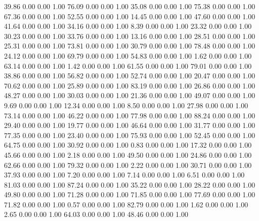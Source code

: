    39.86   0.00   0.00   1.00
   76.09   0.00   0.00   1.00
   35.08   0.00   0.00   1.00
   75.38   0.00   0.00   1.00
   67.36   0.00   0.00   1.00
   52.55   0.00   0.00   1.00
   14.45   0.00   0.00   1.00
   47.60   0.00   0.00   1.00
   41.64   0.00   0.00   1.00
   34.16   0.00   0.00   1.00
    8.39   0.00   0.00   1.00
   23.32   0.00   0.00   1.00
   30.23   0.00   0.00   1.00
   33.76   0.00   0.00   1.00
   13.16   0.00   0.00   1.00
   28.51   0.00   0.00   1.00
   25.31   0.00   0.00   1.00
   73.81   0.00   0.00   1.00
   30.79   0.00   0.00   1.00
   78.48   0.00   0.00   1.00
   24.12   0.00   0.00   1.00
   69.79   0.00   0.00   1.00
   54.83   0.00   0.00   1.00
    1.62   0.00   0.00   1.00
   63.14   0.00   0.00   1.00
    1.42   0.00   0.00   1.00
   61.55   0.00   0.00   1.00
   79.01   0.00   0.00   1.00
   38.86   0.00   0.00   1.00
   56.82   0.00   0.00   1.00
   52.74   0.00   0.00   1.00
   20.47   0.00   0.00   1.00
   70.62   0.00   0.00   1.00
   25.89   0.00   0.00   1.00
   83.19   0.00   0.00   1.00
   26.86   0.00   0.00   1.00
   48.27   0.00   0.00   1.00
   30.03   0.00   0.00   1.00
   21.36   0.00   0.00   1.00
   49.07   0.00   0.00   1.00
    9.69   0.00   0.00   1.00
   12.34   0.00   0.00   1.00
    8.50   0.00   0.00   1.00
   27.98   0.00   0.00   1.00
   73.14   0.00   0.00   1.00
   46.22   0.00   0.00   1.00
   77.98   0.00   0.00   1.00
   88.24   0.00   0.00   1.00
   29.40   0.00   0.00   1.00
   19.77   0.00   0.00   1.00
   46.64   0.00   0.00   1.00
   31.77   0.00   0.00   1.00
   77.35   0.00   0.00   1.00
   23.40   0.00   0.00   1.00
   75.93   0.00   0.00   1.00
   52.45   0.00   0.00   1.00
   64.75   0.00   0.00   1.00
   30.92   0.00   0.00   1.00
    0.83   0.00   0.00   1.00
   17.32   0.00   0.00   1.00
   45.66   0.00   0.00   1.00
    2.18   0.00   0.00   1.00
   49.50   0.00   0.00   1.00
   24.86   0.00   0.00   1.00
   62.66   0.00   0.00   1.00
   79.32   0.00   0.00   1.00
    2.22   0.00   0.00   1.00
   30.71   0.00   0.00   1.00
   37.93   0.00   0.00   1.00
    7.20   0.00   0.00   1.00
    7.14   0.00   0.00   1.00
    6.51   0.00   0.00   1.00
   81.03   0.00   0.00   1.00
   87.24   0.00   0.00   1.00
   35.22   0.00   0.00   1.00
   28.22   0.00   0.00   1.00
   49.80   0.00   0.00   1.00
   71.28   0.00   0.00   1.00
   71.85   0.00   0.00   1.00
   77.69   0.00   0.00   1.00
   71.82   0.00   0.00   1.00
    0.57   0.00   0.00   1.00
   82.79   0.00   0.00   1.00
    1.62   0.00   0.00   1.00
    2.65   0.00   0.00   1.00
   64.03   0.00   0.00   1.00
   48.46   0.00   0.00   1.00
